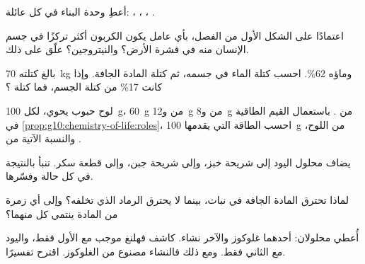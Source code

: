 \begin{exercise}[$\star$]\label{exo:g10:chemistry-of-life:5}
أعطِ وحدة البناء في كل عائلة: ، ، ،
.
\end{exercise}

\begin{exercise}[$\star\star$]\label{exo:g10:chemistry-of-life:6}
اعتمادًا على الشكل الأول من الفصل، بأي عامل يكون الكربون أكثر تركزًا
في جسم الإنسان منه في قشرة الأرض؟ والنيتروجين؟ علّق على ذلك.
\end{exercise}

\begin{exercise}[$\star\star$]\label{exo:g10:chemistry-of-life:7}
بالغ كتلته \qty{70}{kg} وماؤه 62\%. احسب كتلة الماء في جسمه، ثم كتلة
المادة الجافة. وإذا كانت  17\% من كتلة الجسم، فما كتلة
؟
\end{exercise}

\begin{exercise}[$\star\star$]\label{exo:g10:chemistry-of-life:8}
لوح حبوب يحوي، لكل \qty{100}{g}، \qty{60}{g} من 
و\qty{12}{g} من  و\qty{8}{g} من . باستعمال القيم
الطاقية في \cref{prop:g10:chemistry-of-life:roles}، احسب الطاقة التي
يقدمها \qty{100}{g} من اللوح، والنسبة الآتية من .
\end{exercise}

\begin{exercise}[$\star\star$]\label{exo:g10:chemistry-of-life:9}
يضاف محلول اليود إلى شريحة خبز، وإلى شريحة جبن، وإلى قطعة سكر. تنبأ
بالنتيجة في كل حالة وفسّرها.
\end{exercise}

\begin{exercise}[$\star\star$]\label{exo:g10:chemistry-of-life:10}
لماذا تحترق المادة الجافة في نبات، بينما لا يحترق الرماد الذي تخلفه؟
وإلى أي زمرة من المادة ينتمي كل منهما؟
\end{exercise}

\begin{exercise}[$\star\star$]\label{exo:g10:chemistry-of-life:11}
أُعطي محلولان: أحدهما غلوكوز والآخر نشاء. كاشف فهلنغ موجب مع الأول
فقط، واليود مع الثاني فقط. ومع ذلك فالنشاء مصنوع من الغلوكوز. اقترح
تفسيرًا.
\end{exercise}

